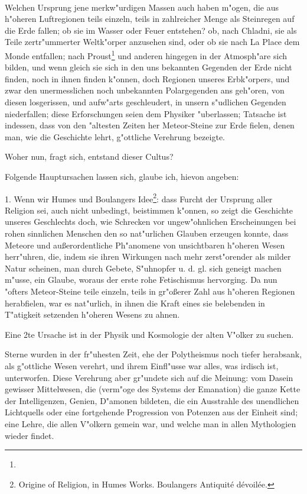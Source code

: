 \documentclass[a4paper, 11pt, oneside, polutonikogreek, german]{article}
\begin{document}
\paragraph{}
Welchen Ursprung jene merkw"urdigen Massen auch haben m"ogen, die aus h"oheren Luftregionen teils einzeln, teils in zahlreicher Menge als Steinregen auf die Erde fallen; ob sie im Wasser oder Feuer entstehen? ob, nach Chladni, sie als Teile zertr"ummerter Weltk"orper anzusehen sind, oder ob sie nach La Place dem Monde entfallen; nach Proust\footnote{} und anderen hingegen in der Atmosph"are sich bilden, und wenn gleich sie sich in den uns bekannten Gegenden der Erde nicht finden, noch in ihnen finden k"onnen, doch Regionen unseres Erbk"orpers, und zwar den unermesslichen noch unbekannten Polargegenden ans geh"oren, von diesen losgerissen, und aufw"arts geschleudert, in unsern s"udlichen Gegenden niederfallen; diese Erforschungen seien dem Physiker "uberlassen; Tatsache ist indessen, dass von den "altesten Zeiten her Meteor-Steine zur Erde fielen, denen man, wie die Geschichte lehrt, g"ottliche Verehrung bezeigte.

Woher nun, fragt sich, entstand dieser Cultus?

Folgende Hauptursachen lassen sich, glaube ich, hievon angeben:

1. Wenn wir Humes und Boulangers Idee\footnote{Origine of Religion, in Humes Works. Boulangers Antiquité dévoilée.}: dass Furcht der Ursprung aller Religion sei, auch nicht unbedingt, beistimmen k"onnen, so zeigt die Geschichte unseres Geschlechts doch, wie Schrecken vor ungew"ohnlichen Erscheinungen bei rohen sinnlichen Menschen den so nat"urlichen Glauben erzeugen konnte, dass Meteore und außerordentliche Ph"anomene von unsichtbaren h"oheren Wesen herr"uhren, die, indem sie ihren Wirkungen nach mehr zerst"orender als milder Natur scheinen, man durch Gebete, S"uhnopfer u. d. gl. sich geneigt machen m"usse, ein Glaube, woraus der erste rohe Fetischismus hervorging. Da nun "ofters Meteor-Steine teile einzeln, teils in gr"oßerer Zahl aus h"oheren Regionen herabfielen, war es nat"urlich, in ihnen die Kraft eines sie belebenden in T"atigkeit setzenden h"oheren Wesens zu ahnen.

Eine 2te Ursache ist in der Physik und Kosmologie der alten V"olker zu suchen.

Sterne wurden in der fr"uhesten Zeit, ehe der Polytheismus noch tiefer herabsank, als g"ottliche Wesen verehrt, und ihrem Einfl"usse war alles, was irdisch ist, unterworfen. Diese Verehrung aber gr"undete sich auf die Meinung: vom Dasein gewisser Mittelwesen, die (verm"oge des Systems der Emanation) die ganze Kette der Intelligenzen, Genien, D"amonen bildeten, die ein Ausstrahle des unendlichen Lichtquells oder eine fortgehende Progression von Potenzen aus der Einheit sind; eine Lehre, die allen V"olkern gemein war, und welche man in allen Mythologien wieder findet.
\end{document}
